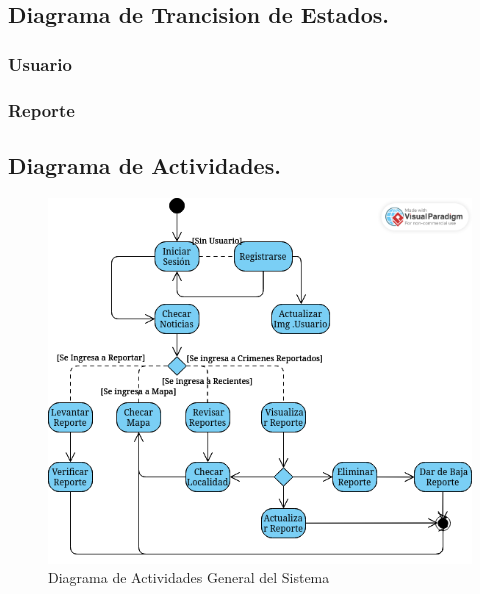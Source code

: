 \documentclass{article}
\begin{document}
    \subsection{Diagrama de Trancision de Estados.}
        \subsubsection{Usuario}
        \subsubsection{Reporte}
    \subsection{Diagrama de Actividades.}
    \begin{figure}[H]
        \centering
        \includegraphics[width=1\linewidth]{ActivityDiagramADS.png}
        \caption{Diagrama de Actividades General del Sistema}
        \label{fig:enter-label}
    \end{figure}
\end{document}
